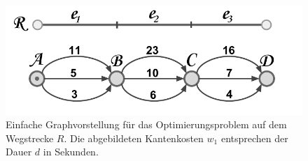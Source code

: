 \documentclass[12pt]{article}
\begin{document}
\begin{figure}[h]
	\begin{center}
	\includegraphics[width=320pt]{pics/pdf/005_Graph_der_Optimierung_Falsch.pdf}
	\caption{Einfache Graphvorstellung für das Optimierungsproblem auf dem Wegstrecke $R$. Die abgebildeten Kantenkosten $w_1$ entsprechen der Dauer $d$ in Sekunden.}
	\label{pic:graph_simple}
	\end{center}
\end{figure}
\end{document}
